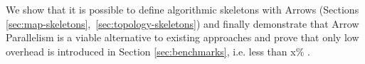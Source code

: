 We show that it is possible to define algorithmic skeletons with Arrows (Sections \ref{sec:map-skeletons},~\ref{sec:topology-skeletons}) and finally demonstrate that Arrow Parallelism is a viable alternative to existing approaches and prove that only low overhead is introduced in Section \ref{sec:benchmarks}, i.e. less than x\% .







